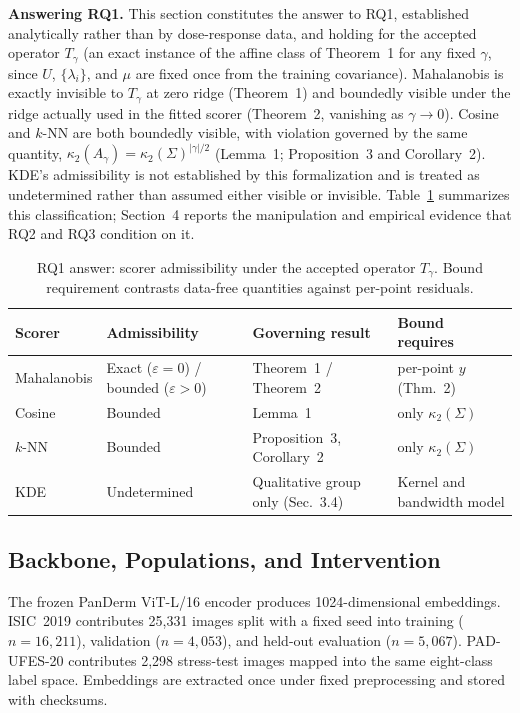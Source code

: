 \documentclass[pdflatex,sn-basic]{sn-jnl}
\theoremstyle{plain}
\theoremstyle{definition}
\theoremstyle{remark}
\begin{document}
\textbf{Answering RQ1.} This section constitutes the answer to RQ1, established analytically rather than by dose-response data, and holding for the accepted operator $T_\gamma$ (an exact instance of the affine class of Theorem~1 for any fixed $\gamma$, since $U$, $\{\lambda_i\}$, and $\mu$ are fixed once from the training covariance). Mahalanobis is exactly invisible to $T_\gamma$ at zero ridge (Theorem~1) and boundedly visible under the ridge actually used in the fitted scorer (Theorem~2, vanishing as $\gamma\to0$). Cosine and $k$-NN are both boundedly visible, with violation governed by the same quantity, $\kappa_2(A_\gamma)=\kappa_2(\Sigma)^{|\gamma|/2}$ (Lemma~1; Proposition~3 and Corollary~2). KDE's admissibility is not established by this formalization and is treated as undetermined rather than assumed either visible or invisible. Table~\ref{tab:rq1-admissibility} summarizes this classification; Section~4 reports the manipulation and empirical evidence that RQ2 and RQ3 condition on it.

\begin{table}[t]
\centering
\caption{RQ1 answer: scorer admissibility under the accepted operator $T_\gamma$. Bound requirement contrasts data-free quantities against per-point residuals.}
\label{tab:rq1-admissibility}
\small
\begin{tabular}{p{2.0cm}p{3.2cm}p{3.4cm}p{3.4cm}}
\toprule
Scorer & Admissibility & Governing result & Bound requires\\
\midrule
Mahalanobis & Exact ($\varepsilon=0$) / bounded ($\varepsilon>0$) & Theorem~1 / Theorem~2 & per-point $y$ (Thm.~2)\\
Cosine & Bounded & Lemma~1 & only $\kappa_2(\Sigma)$\\
$k$-NN & Bounded & Proposition~3, Corollary~2 & only $\kappa_2(\Sigma)$\\
KDE & Undetermined & Qualitative group only (Sec.~3.4) & Kernel and bandwidth model\\
\bottomrule
\end{tabular}
\end{table}

\subsection{Backbone, Populations, and Intervention}
The frozen PanDerm ViT-L/16 encoder produces 1024-dimensional embeddings. ISIC~2019 contributes 25,331 images split with a fixed seed into training ($n=16{,}211$), validation ($n=4{,}053$), and held-out evaluation ($n=5{,}067$). PAD-UFES-20 contributes 2,298 stress-test images mapped into the same eight-class label space. Embeddings are extracted once under fixed preprocessing and stored with checksums.
\end{document}
